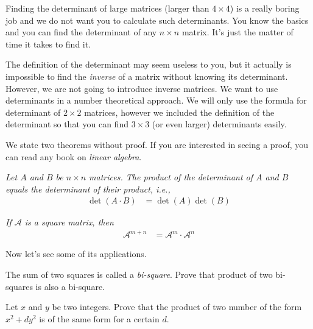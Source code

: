 \documentclass{subfile}
\begin{document}
Finding the determinant of large matrices (larger than $4 \times 4$) is a really boring job and we do not want you to calculate such determinants. You know the basics and you can find the determinant of any $n\times n$ matrix. It's just the matter of time it takes to find it.

The definition of the determinant may seem useless to you, but it actually is impossible to find the \textit{inverse} of a matrix without knowing its determinant. However, we are not going to introduce inverse matrices. We want to use determinants in a number theoretical approach. We will only use the formula for determinant of $2 \times 2$ matrices, however we included the definition of the determinant so that you can find $3 \times 3$ (or even larger) determinants easily.

We state two theorems without proof. If you are interested in seeing a proof, you can read any book on \textit{linear algebra}.

	\begin{theorem}\slshape
	Let $A$ and $B$ be $n\times n$ matrices. The product of the determinant of $A$ and $B$ equals the determinant of their product, i.e.,
		\begin{align*}
			\det(A \cdot B)
				& =\det(A)\det(B)
		\end{align*}
	\end{theorem}


\begin{theorem}\slshape
If $\mathcal A$ is a square matrix, then
	\begin{align*}
		\mathcal A^{m+n}
			& =\mathcal A^m \cdot \mathcal{A}^n
	\end{align*}
\end{theorem}

Now let's see some of its applications.

\begin{problem}
The sum of two squares is called a \textit{bi-square}. Prove that product of two bi-squares is also a bi-square.
\end{problem}

\begin{problem}
Let $x$ and $y$ be two integers. Prove that the product of two number of the form $x^2+dy^2$ is of the same form for a  certain $d$.
\end{problem}
\end{document}
